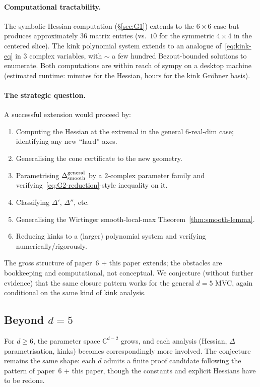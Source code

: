 \documentclass[11pt,a4paper]{article}
\begin{document}
\paragraph{Computational tractability.}
The symbolic Hessian computation (§\ref{sec:G1}) extends to the
$6\times 6$ case but produces approximately $36$ matrix entries (vs.\
$10$ for the symmetric $4\times 4$ in the centered slice). The kink
polynomial system extends to an analogue of~\eqref{eq:kink-eq} in
$3$ complex variables, with $\sim$ a few hundred Bezout-bounded
solutions to enumerate. Both computations are within reach of sympy
on a desktop machine (estimated runtime: minutes for the Hessian,
hours for the kink Gröbner basis).

\paragraph{The strategic question.}
A successful extension would proceed by:
\begin{enumerate}
\item Computing the Hessian at the extremal in the general
  $6$-real-dim case; identifying any new ``hard'' axes.
\item Generalising the cone certificate to the new geometry.
\item Parametrising $\Delta_{\rm smooth}^{\rm general}$ by a $2$-complex
  parameter family and verifying~\eqref{eq:G2-reduction}-style
  inequality on it.
\item Classifying $\Delta'$, $\Delta''$, etc.
\item Generalising the Wirtinger smooth-local-max
  Theorem~\ref{thm:smooth-lemma}.
\item Reducing kinks to a (larger) polynomial system and verifying
  numerically/rigorously.
\end{enumerate}
The gross structure of paper~6 + this paper extends; the obstacles
are bookkeeping and computational, not conceptual. We conjecture
(without further evidence) that the same closure pattern works for
the general $d=5$ MVC, again conditional on the same kind of kink
analysis.

\subsection*{Beyond $d=5$}

For $d\ge 6$, the parameter space $\mathbb{C}^{d-2}$ grows, and each
analysis (Hessian, $\Delta$ parametrisation, kinks) becomes
correspondingly more involved. The conjecture remains the same shape:
each $d$ admits a finite proof candidate following the pattern of
paper~6 + this paper, though the constants and explicit Hessians have
to be redone.
\end{document}
